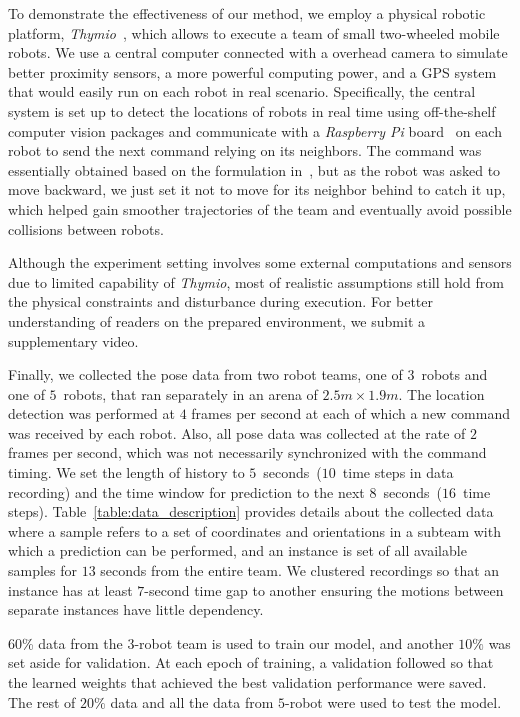 \documentclass[letterpaper, 10 pt, conference]{ieeeconf}  %
\begin{document}
	To demonstrate the effectiveness of our method, we employ a physical robotic platform,
	\emph{Thymio}~\cite{Shin14}, which allows to execute a team of small two-wheeled
	mobile robots. We use a central computer connected with a overhead camera to simulate
	better proximity
	sensors, a more powerful computing power, and a GPS system that would easily run on each robot in
	real scenario.
	Specifically, the central system is set up to detect the locations of robots in real
	time using off-the-shelf computer vision packages
	and communicate with a \emph{Raspberry Pi} board~\cite{Upton14} on each robot to send
	the next command relying on its neighbors.
	The command was essentially obtained based on the formulation in~\cite{CPR17}, but
    as the robot was asked to move backward, we just set it not to move for its
	neighbor behind to catch it up, which helped gain smoother trajectories of the team
	and eventually avoid possible collisions between robots.

	Although the experiment setting involves
	some external computations and sensors due to limited capability of \emph{Thymio},
	most of realistic assumptions still hold from the physical constraints and disturbance
	during execution. For better understanding of readers on the prepared environment,
	we submit a supplementary video.

	Finally, we collected the pose data from two robot teams, one of $3$~robots and one
	of $5$~robots, that ran separately in an arena of $2.5 m \times 1.9 m$.
	The location detection was performed at $4$ frames per second at each of
	which a new command was received by each robot. Also, all pose data was
	collected at the rate of $2$ frames per second,
	which was not necessarily synchronized with the command timing.
	We set the length of history to $5$~seconds~($10$~time steps in data recording) and
	the time window for prediction to the next $8$~seconds~($16$~time steps).
	Table~\ref{table:data_description} provides details about the collected data
	where a sample refers to a set of coordinates and orientations in a subteam
	with which a prediction can be performed, and an instance is set of all available samples for $13$ seconds from the entire team. We clustered recordings so that
	an instance has at least $7$-second time gap to another ensuring
	the motions between separate instances have little dependency.

	$60$\% data from the $3$-robot team is used to train our model, and another $10\%$
	was set aside for validation. At each epoch of training, a validation followed so that
	the learned weights that achieved the best validation performance were saved.
	The rest of $20\%$ data and all the data from $5$-robot were used to test the model.
\end{document}
